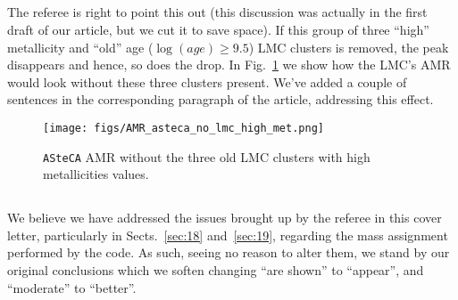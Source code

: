 \documentclass{article}
\begin{document}
\subsection{}
The referee is right to point this out (this discussion was actually in the
first draft of our article, but we cut it to save space).
If this group of three ``high'' metallicity and ``old'' age ($\log(age)\ge9.5$)
LMC clusters is removed, the peak disappears and hence, so
does the drop. In Fig.~\ref{fig:amr_no_high_met} we show how the LMC's AMR
would look without these three clusters present.
We've added a couple of sentences in the corresponding paragraph of the article,
addressing this effect.

\begin{figure}
    \centering
    \texttt{[image: figs/AMR\_asteca\_no\_lmc\_high\_met.png]}
    \caption{\texttt{ASteCA} AMR without the three old LMC clusters with
    high metallicities values.}
\label{fig:amr_no_high_met}
\end{figure}

\subsection{}
We believe we have addressed the issues brought up by the referee in this cover
letter, particularly in Sects.~\ref{sec:18} and~\ref{sec:19}, regarding the mass
assignment performed by the code.
As such, seeing no reason to alter them, we stand by our original conclusions
which we soften changing ``are shown'' to ``appear'', and ``moderate'' to
``better''.


\end{document}

